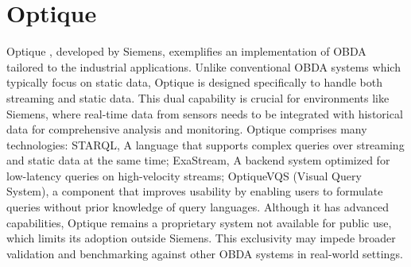 \section{Optique}
Optique \cite{DBLP:journals/ws/KharlamovMSXKR19}, developed by Siemens, exemplifies an implementation of \ac{OBDA} tailored to the industrial applications. Unlike conventional \ac{OBDA} systems which typically focus on static data, Optique is designed specifically to handle both streaming and static data. This dual capability is crucial for environments like Siemens, where real-time data from sensors needs to be integrated with historical data for comprehensive analysis and monitoring.
Optique comprises many technologies: \ac{STARQL}, A language that supports complex queries over streaming and static data at the same time; ExaStream, A backend system optimized for low-latency queries on high-velocity streams; OptiqueVQS (Visual Query System), a component that improves usability by enabling users to formulate queries without prior knowledge of query languages.
Although it has advanced capabilities, Optique remains a proprietary system not available for public use, which limits its adoption outside Siemens. This exclusivity may impede broader validation and benchmarking against other \ac{OBDA} systems in real-world settings.